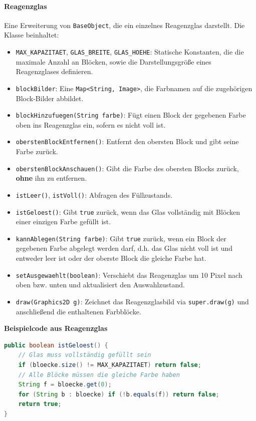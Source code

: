 \paragraph{Reagenzglas}
Eine Erweiterung von \texttt{BaseObject}, die ein einzelnes Reagenzglas darstellt.
Die Klasse beinhaltet:

\begin{sloppypar}
    \begin{itemize}
        \item \texttt{MAX\_KAPAZITAET}, \texttt{GLAS\_BREITE}, \texttt{GLAS\_HOEHE}: Statische Konstanten, die die maximale Anzahl an Blöcken, sowie die Darstellungsgröße eines Reagenzglases definieren.
        \item \texttt{blockBilder}: Eine \texttt{Map<String, Image>}, die Farbnamen auf die zugehörigen Block-Bilder abbildet.
        \item \texttt{blockHinzufuegen(String farbe)}: Fügt einen Block der gegebenen Farbe oben ins Reagenzglas ein, sofern es nicht voll ist.
        \item \texttt{oberstenBlockEntfernen()}: Entfernt den obersten Block und gibt seine Farbe zurück.
        \item \texttt{oberstenBlockAnschauen()}: Gibt die Farbe des obersten Blocks zurück, \textbf{ohne} ihn zu entfernen.
        \item \texttt{istLeer()}, \texttt{istVoll()}: Abfragen des Füllzustands.
        \item \texttt{istGeloest()}: Gibt \texttt{true} zurück, wenn das Glas vollständig mit Blöcken einer einzigen Farbe gefüllt ist.
        \item \texttt{kannAblegen(String farbe)}: Gibt \texttt{true} zurück, wenn ein Block der gegebenen Farbe abgelegt werden darf, d.h. das Glas nicht voll ist und entweder leer ist oder der oberste Block die gleiche Farbe hat.
        \item \texttt{setAusgewaehlt(boolean)}: Verschiebt das Reagenzglas um 10 Pixel nach oben bzw. unten und aktualisiert den Auswahlzustand.
        \item \texttt{draw(Graphics2D g)}: Zeichnet das Reagenzglasbild via \texttt{super.draw(g)} und anschließend die enthaltenen Farbblöcke.
    \end{itemize}
\end{sloppypar}

\textbf{Beispielcode aus Reagenzglas}
\begin{lstlisting}[caption=istGeloest-Methode, label=lst:mgistgeloest, captionpos=t, language=Java]
public boolean istGeloest() {
    // Glas muss vollständig gefüllt sein
    if (bloecke.size() != MAX_KAPAZITAET) return false;
    // Alle Blöcke müssen die gleiche Farbe haben
    String f = bloecke.get(0);
    for (String b : bloecke) if (!b.equals(f)) return false;
    return true;
}
\end{lstlisting}

